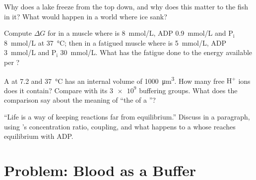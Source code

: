 \begin{exercise}[$\star\star$]\label{exo:b1:water-small-molecules:9}
Why does a lake freeze from the top down, and why does this matter to
the fish in it? What would happen in a world where ice sank?
\end{exercise}

\begin{exercise}[$\star\star\star$]\label{exo:b1:water-small-molecules:10}
Compute $\Delta G$ for   in a muscle  where  is
\qty{8}{mmol/L}, ADP \qty{0.9}{mmol/L} and $\mathrm{P_i}$
\qty{8}{mmol/L} at \qty{37}{\celsius}; then in a fatigued muscle where
 is \qty{5}{mmol/L}, ADP \qty{3}{mmol/L} and $\mathrm{P_i}$
\qty{30}{mmol/L}. What has the fatigue done to the energy available
per ?
\end{exercise}

\begin{exercise}[$\star\star\star$]\label{exo:b1:water-small-molecules:11}
A  at  7.2 and \qty{37}{\celsius} has an internal volume of
\qty{1000}{\micro m^3}. How many free $\mathrm{H^+}$ ions does it
contain? Compare with its $\num{3e9}$ buffering groups. What does the
comparison say about the meaning of ``the  of a ''?
\end{exercise}

\begin{exercise}[$\star\star\star$]\label{exo:b1:water-small-molecules:12}
``Life is a way of keeping reactions far from equilibrium.'' Discuss in
a paragraph, using 's concentration ratio, coupling, and what
happens to a  whose  reaches equilibrium with ADP.
\end{exercise}

\section{Problem: Blood as a Buffer}

